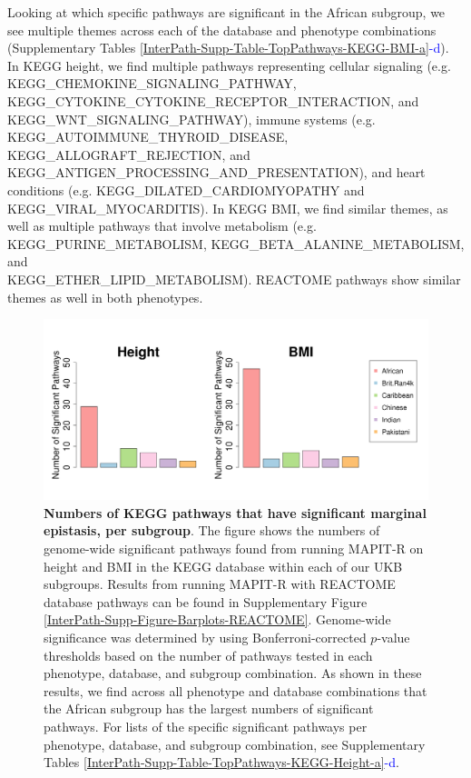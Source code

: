 \documentclass[12pt,a4paper]{article}
\begin{document}
Looking at which specific pathways are significant in the African subgroup, we see multiple themes across each of the database and phenotype combinations (Supplementary Tables \ref{InterPath-Supp-Table-TopPathways-KEGG-BMI-a}\textcolor{blue}{-d}). In KEGG height, we find multiple pathways representing cellular signaling (e.g. KEGG\_CHEMOKINE\_SIGNALING\_PATHWAY, KEGG\_CYTOKINE\_CYTOKINE\_RECEPTOR\_INTERACTION, and \\ KEGG\_WNT\_SIGNALING\_PATHWAY), immune systems (e.g. \\ KEGG\_AUTOIMMUNE\_THYROID\_DISEASE, KEGG\_ALLOGRAFT\_REJECTION, and KEGG\_ANTIGEN\_PROCESSING\_AND\_PRESENTATION), and heart conditions (e.g. KEGG\_DILATED\_CARDIOMYOPATHY and \\ KEGG\_VIRAL\_MYOCARDITIS). In KEGG BMI, we find similar themes, as well as multiple pathways that involve metabolism (e.g. KEGG\_PURINE\_METABOLISM, KEGG\_BETA\_ALANINE\_METABOLISM, and \\ KEGG\_ETHER\_LIPID\_METABOLISM). REACTOME pathways show similar themes as well in both phenotypes.

\begin{figure}[htb]
\centering
\hspace*{-.9cm}
\includegraphics[scale=.45]{Images/Main/InterPath_Main_Figure_Barplots_KEGG_vs2.png}
\caption[TBD]{\textbf{Numbers of KEGG pathways that have significant marginal epistasis, per subgroup}. The figure shows the numbers of genome-wide significant pathways found from running MAPIT-R on height and BMI in the KEGG database within each of our UKB subgroups. Results from running MAPIT-R with REACTOME database pathways can be found in Supplementary Figure \ref{InterPath-Supp-Figure-Barplots-REACTOME}. Genome-wide significance was determined by using Bonferroni-corrected $p$-value thresholds based on the number of pathways tested in each phenotype, database, and subgroup combination. As shown in these results, we find across all phenotype and database combinations that the African subgroup has the largest numbers of significant pathways. For lists of the specific significant pathways per phenotype, database, and subgroup combination, see Supplementary Tables \ref{InterPath-Supp-Table-TopPathways-KEGG-Height-a}\textcolor{blue}{-d}.}
\label{InterPath-Main-Figure-Barplots-KEGG}
\end{figure}
\end{document}
